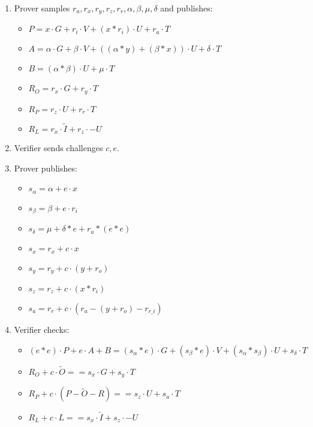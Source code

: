 \documentclass[]{article}
\begin{document}
\begin{enumerate}
	\item
	Prover samples $r_a, r_x, r_y, r_z, r_r, \alpha, \beta, \mu, \delta$ and publishes:
	\begin{itemize}
		\item
		$P = x \cdot G + r_i \cdot V + (x * r_i) \cdot U + r_a \cdot T$

		\item
		$A = \alpha \cdot G + \beta \cdot V + ((\alpha * y) + (\beta * x)) \cdot U + \delta \cdot T$
		\item
		$B = (\alpha * \beta) \cdot U + \mu \cdot T$

		\item
		$R_O = r_x \cdot G + r_y \cdot T$
		\item
		$R_P = r_z \cdot U + r_r \cdot T$
		\item
		$R_L = r_x \cdot \tilde{I} + r_z \cdot -U$		
	\end{itemize}
	\item
	Verifier sends challenges $c, e$.
	\item
	Prover publishes:
	\begin{itemize}
		\item
		$s_\alpha = \alpha + e \cdot x$	
		\item
		$s_\beta = \beta + e \cdot r_i$
		\item
		$s_\delta = \mu + \delta * e + r_a * (e * e)$

		\item
		$s_x = r_x + c \cdot x$	
		\item
		$s_y = r_y + c \cdot (y + r_o)$
		\item
		$s_z = r_z + c \cdot (x * r_i)$
		\item
		$s_a = r_r + c \cdot (r_a - (y + r_o) - r_{r\_i})$
	\end{itemize}
	\item
	Verifier checks:
	\begin{itemize}
		\item
		$(e * e) \cdot P + e \cdot A + B = (s_\alpha * e) \cdot G + (s_\beta * e) \cdot V + (s_\alpha * s_\beta) \cdot U + s_\delta \cdot T$
		\item
		$R_O + c \cdot \tilde{O} == s_x \cdot G + s_y \cdot T$
		\item
		$R_P + c \cdot (P - \tilde{O} - R) == s_z \cdot U + s_a \cdot T$
		\item
		$R_L + c \cdot L == s_x \cdot \tilde{I} + s_z \cdot -U$
	\end{itemize}
\end{enumerate}
\end{document}
